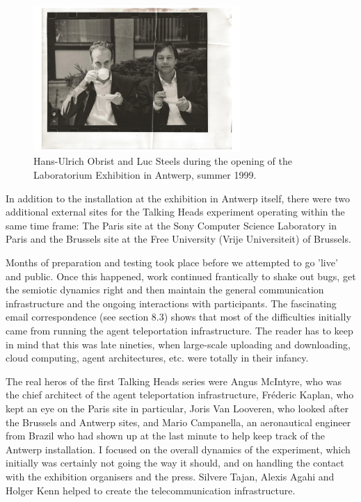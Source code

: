 \begin{figure}[htbp]
  \centerline{\includegraphics[width=0.7\textwidth]{chap8/figures/hu-obrist+ls}}
\caption{ \label{fig:faces} 
Hans-Ulrich Obrist and Luc Steels during the opening of the Laboratorium Exhibition in Antwerp, summer 1999. }
\end{figure}
In addition to the installation at the exhibition in Antwerp itself, there were two additional 
external sites for the Talking Heads experiment operating within the same time frame: The Paris site at the Sony Computer 
Science Laboratory in Paris and the Brussels site at the Free University (Vrije Universiteit) of Brussels.

Months of preparation and testing took place before we attempted to go 'live' and public. 
Once this happened, work continued frantically to shake out bugs, get the semiotic dynamics right
and then maintain the general communication infrastructure and the ongoing interactions with participants. 
The fascinating email correspondence (see section 8.3) shows that most of the difficulties initially came 
from running the agent teleportation infrastructure. The reader has to keep in mind that this was 
late nineties, when large-scale uploading 
and downloading, cloud computing, agent architectures, etc. were totally in their infancy. 

The real heros of the first Talking Heads series were
Angus McIntyre, who was the chief architect of the agent teleportation infrastructure, 
Fr\'{e}deric Kaplan, who kept an eye on the Paris site in particular, Joris Van Looveren, who looked after the 
Brussels and Antwerp sites, and Mario Campanella, an aeronautical engineer from Brazil who 
had shown up at the last minute to 
help keep track of the Antwerp installation. I focused on the overall dynamics of the experiment, which 
initially was certainly not going the way it should, and on handling the contact with the exhibition organisers and 
the press. Silvere Tajan, Alexis Agahi and Holger Kenn helped to create the telecommunication infrastructure. 
